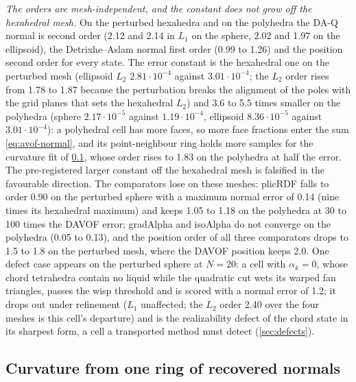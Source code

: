 \documentclass[preprint,12pt]{elsarticle}
\begin{document}
\emph{The orders are mesh-independent, and the constant does not grow off the hexahedral mesh.} On the perturbed hexahedra and on the polyhedra the DA-Q normal is second order (2.12 and 2.14 in $L_1$ on the sphere, 2.02 and 1.97 on the ellipsoid), the Detrixhe--Aslam normal first order (0.99 to 1.26) and the position second order for every state. The error constant is the hexahedral one on the perturbed mesh (ellipsoid $L_2$ $2.81\cdot10^{-4}$ against $3.01\cdot10^{-4}$; the $L_2$ order rises from 1.78 to 1.87 because the perturbation breaks the alignment of the poles with the grid planes that sets the hexahedral $L_2$) and 3.6 to 5.5 times smaller on the polyhedra (sphere $2.17\cdot10^{-5}$ against $1.19\cdot10^{-4}$, ellipsoid $8.36\cdot10^{-5}$ against $3.01\cdot10^{-4}$): a polyhedral cell has more faces, so more face fractions enter the sum \cref{eq:avof-normal}, and its point-neighbour ring holds more samples for the curvature fit of \cref{sec:curv}, whose order rises to 1.83 on the polyhedra at half the error. The pre-registered larger constant off the hexahedral mesh is falsified in the favourable direction. The comparators lose on these meshes: plicRDF falls to order 0.90 on the perturbed sphere with a maximum normal error of 0.14 (nine times its hexahedral maximum) and keeps 1.05 to 1.18 on the polyhedra at 30 to 100 times the DAVOF error; gradAlpha and isoAlpha do not converge on the polyhedra (0.05 to 0.13), and the position order of all three comparators drops to 1.5 to 1.8 on the perturbed mesh, where the DAVOF position keeps 2.0. One defect case appears on the perturbed sphere at $N = 20$: a cell with $\alpha_k = 0$, whose chord tetrahedra contain no liquid while the quadratic cut wets its warped fan triangles, passes the wisp threshold and is scored with a normal error of 1.2; it drops out under refinement ($L_1$ unaffected; the $L_2$ order 2.40 over the four meshes is this cell's departure) and is the realizability defect of the chord state in its sharpest form, a cell a transported method must detect (\cref{sec:defects}).

\subsection{Curvature from one ring of recovered normals}
\label{sec:curv}
\end{document}

